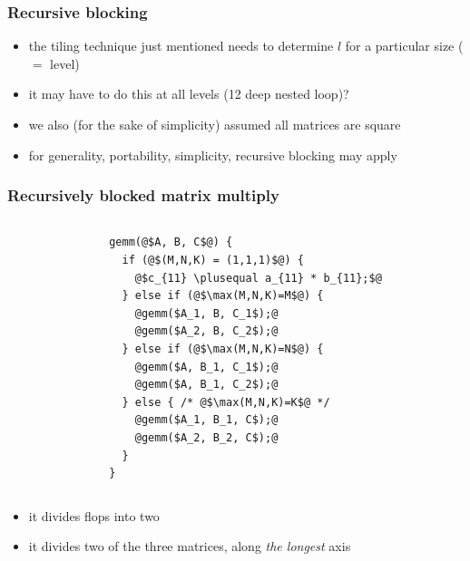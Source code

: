\documentclass[12pt,dvipdfmx]{beamer}
\newcommand{\plusequal}{\mbox{\tt\ += }}
\newcommand{\ao}[1]{{\color{blue}#1}}
\begin{document}
\begin{frame}
\frametitle{Recursive blocking}
\begin{itemize}
\item the tiling technique just mentioned needs to determine $l$ 
  for a particular size ($=$ level)
\item it may have to do this at all levels (12 deep nested loop)?
\item we also (for the sake of simplicity) assumed all matrices are square
\item for generality, portability, simplicity, \ao{recursive blocking} may apply
\end{itemize}

\end{frame}


\begin{frame}[fragile]
\frametitle{Recursively blocked matrix multiply}
\begin{columns}[t]
\begin{column}{0.47\textwidth}

\begin{center}
\def\svgwidth{0.8\textwidth}
{\tiny}
\end{center}

\end{column}
\begin{column}{0.43\textwidth}
\begin{lstlisting}[basicstyle=\scriptsize]
gemm(@$A, B, C$@) {
  if (@$(M,N,K) = (1,1,1)$@) {
    @$c_{11} \plusequal a_{11} * b_{11};$@
  } else if (@$\max(M,N,K)=M$@) {
    @gemm($A_1, B, C_1$);@
    @gemm($A_2, B, C_2$);@
  } else if (@$\max(M,N,K)=N$@) {
    @gemm($A, B_1, C_1$);@
    @gemm($A, B_1, C_2$);@
  } else { /* @$\max(M,N,K)=K$@ */
    @gemm($A_1, B_1, C$);@
    @gemm($A_2, B_2, C$);@
  }
}
\end{lstlisting}
\end{column}
\end{columns}

\begin{itemize}
\item it divides flops into two 
\item it divides two of the three matrices, 
along \ao{\em the longest} axis
\end{itemize}

\end{frame}
\end{document}
